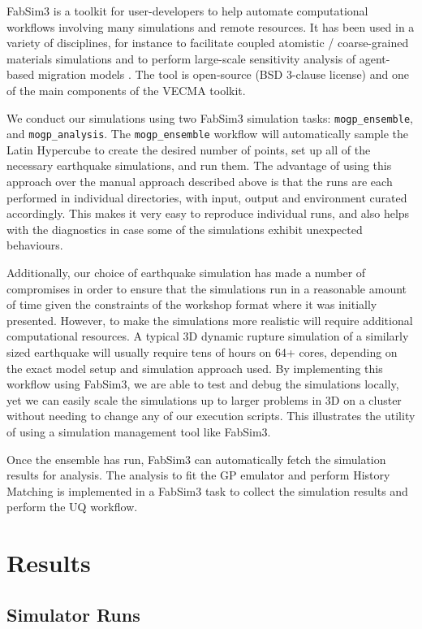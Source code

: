 \documentclass[openacc]{rstransa}%
\begin{document}
FabSim3 is a toolkit for user-developers to help automate computational workflows involving many simulations and remote resources. It has been used in a variety of disciplines, for instance to facilitate coupled atomistic / coarse-grained materials simulations and to perform large-scale sensitivity analysis of agent-based migration models \cite{fabsim}. The tool is open-source (BSD 3-clause license) and one of the main components of the VECMA toolkit.

We conduct our simulations using two FabSim3 simulation tasks: \texttt{mogp\_ensemble}, and
\texttt{mogp\_analysis}.
The \texttt{mogp\_ensemble} workflow will automatically sample the Latin Hypercube to create the desired number of points, set up all of the necessary earthquake simulations, and run them. The advantage of using this approach over the manual approach described above is that the runs are each performed in individual directories, with input, output and environment curated accordingly. This makes it very easy to reproduce individual runs, and also helps with the diagnostics in case some of the simulations exhibit unexpected behaviours.

Additionally, our choice of earthquake simulation has made a number of compromises in order to
ensure that the simulations run in a reasonable amount of time given the constraints of the
workshop format where it was initially presented. However, to make the simulations more realistic
will require additional computational resources. A typical 3D dynamic rupture simulation of a similarly
sized earthquake will usually require tens of hours on 64+ cores, depending
on the exact model setup and simulation approach used. By implementing this workflow using FabSim3,
we are able to test and debug the simulations locally, yet we can easily scale the simulations
up to larger problems in 3D on a cluster without needing to change any of our execution scripts.
This illustrates the utility of using a simulation management tool like FabSim3.

Once the ensemble has run, FabSim3 can automatically fetch the simulation results for analysis. The
analysis to fit the GP emulator and perform History Matching is implemented in a FabSim3 task to
collect the simulation results and perform the UQ workflow.

\section{Results}

\subsection{Simulator Runs}
\end{document}

